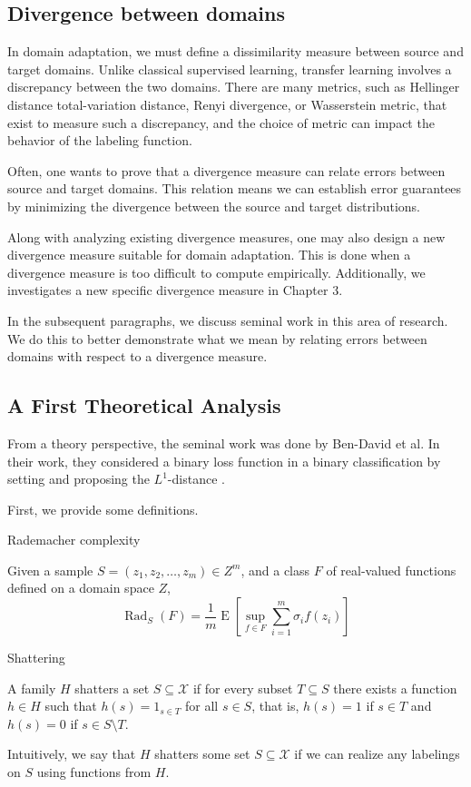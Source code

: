\subsection{Divergence between domains}

In domain adaptation, we must define a dissimilarity measure between source and target domains. Unlike classical supervised learning, transfer learning involves a discrepancy between the two domains. There are many metrics, such as Hellinger distance total-variation distance, Renyi divergence, or Wasserstein metric, that exist to measure such a discrepancy, and the choice of metric can impact the behavior of the labeling function. \cite{Redko2017}

Often, one wants to prove that a divergence measure can relate errors between source and target domains. This relation means we can establish error guarantees by minimizing the divergence between the source and target distributions.

Along with analyzing existing divergence measures, one may also design a new divergence measure suitable for domain adaptation. This is done when a divergence measure is too difficult to compute empirically.  Additionally, we investigates a new specific divergence measure in Chapter 3.

In the subsequent paragraphs, we discuss seminal work in this area of research. We do this to better demonstrate what we mean by relating errors between domains with respect to a divergence measure.

\subsection*{A First Theoretical Analysis}
From a theory perspective, the seminal work was done by Ben-David et al. In their work, they considered a binary loss function in a binary classification by setting and proposing the $L^1$-distance \cite{Ben-David2007}.

First, we provide some definitions.

\begin{definition}{Rademacher complexity}
	
	Given a sample $S=(z_1, z_2, \dots, z_m) \in Z^m$, and a class $F$ of real-valued functions defined on a domain space $Z$,
	\[
	\operatorname{Rad}_S(F) 
	= 
	\frac{1}{m}
	\operatorname{E} \left[
	\sup_{f \in F}
	\sum_{i=1}^m \sigma_i f(z_i) 
	\right]
	\]
\end{definition}

\begin{definition}{Shattering}
	
	A family $H$ shatters a set $S \subseteq \mathcal{X}$ if for every subset $T \subseteq S$ there exists a function $h \in H$ such that $h(s) = 1_{s \in T}$ for all $s \in S$, that is, $h(s) = 1$ if $s \in T$ and $h(s) = 0$ if $s \in S \setminus T$.
	
	Intuitively, we say that $H$ shatters some set $S \subseteq \mathcal{X}$ if we can realize any labelings on $S$ using functions from $H$.
	
\end{definition}

